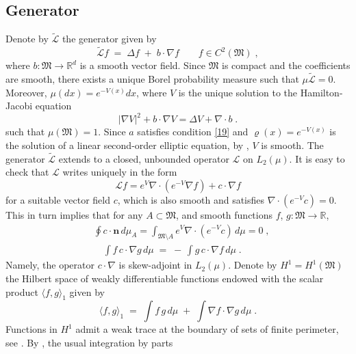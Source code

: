 \documentclass[reqno]{amsart}
\newcounter{as}[section]
\newcommand{\mc}[1]{{\mathcal #1}}
\newcommand{\mf}[1]{{\mathfrak #1}}
\newcommand{\bb}[1]{{\mathbb #1}}
\newcommand{\bs}[1]{{\boldsymbol #1}}
\newcommand{\<}{\langle}
\renewcommand{\>}{\rangle}
\begin{document}
\subsection{Generator}
Denote by $\tilde {\mc L}$ the generator given by
\begin{equation*}
\tilde{\mc L}f\;=\; \Delta f \;+\; b \cdot \nabla f \qquad
f\in C^2(\mf M)\;,
\end{equation*}
where $b\colon \mf M \to \bb R^d$ is a smooth vector field. Since $\mf M$
is compact and the coefficients are smooth, there exists a unique Borel probability measure such that $\mu \tilde{\mc L}=0$. Moreover, $\mu(dx) =e^{-V(x)}dx$,
where $V$ is the unique solution to the Hamilton-Jacobi equation
\begin{equation*}
|\nabla V|^2+b\cdot \nabla V=\Delta V+\nabla \cdot b\; .
\end{equation*}
such that $\mu(\mf M)=1$. Since $a$ satisfies condition \eqref{19} and $\varrho (x) = e^{-V(x)}$
is the solution of a linear second-order elliptic equation, by
\cite[Theorem 8.3]{gt}, $V$ is smooth.
The generator $\tilde{\mc L}$ extends to a closed, unbounded operator $\mc L$ on $L_2(\mu)$. It is easy to check that $\mc L$ writes uniquely in the form
\begin{equation}
\label{e:gen2}
\mc Lf= e^V \nabla \cdot \left( e^{-V} \nabla f\right)+ c\cdot \nabla f
\end{equation}
for a suitable vector field $c$, which is also smooth and satisfies $\nabla \cdot (e^{-V}c)=0$. This in turn implies that for any
$A\subset \mf M$, and smooth functions $f$, $g\colon \mf M\to \bb R$,
\begin{equation}
\label{e:cintb}
\begin{aligned}
& \oint c \cdot \bs n \, d\mu_A = \int_{\mf M\setminus A} e^V \nabla
\cdot (e^{-V} c)\, d\mu =0\;, \\
& \quad \int f \, c\cdot \nabla g \, d\mu
\;=\; -\, \int g\,  c\cdot \nabla f \, d\mu\;.
\end{aligned}
\end{equation}
Namely, the operator $c\cdot \nabla$ is skew-adjoint in $L_2(\mu)$.
Denote by $H^1=H^1(\mf M)$ the Hilbert space of weakly differentiable
functions endowed with the scalar product $\<f,g\>_1$ given by
\begin{equation*}
\< f , g\>_1 \;=\; \int  f \, g \, d \mu \;+\;
\int \nabla f \cdot \nabla g \, d \mu \;.
\end{equation*}
Functions in $H^1$ admit a weak trace at the boundary of sets of finite perimeter, see \cite{cf}. By \cite[Theorem~2.1-2.2]{cf}, the usual integration by parts
\end{document}
